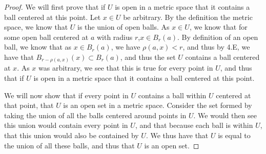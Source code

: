 \begin{proof}
  We will first prove that if $U$ is open in a metric space that it
  contains a ball centered at this point. Let $x \in U$ be arbitrary.
  By the definition the metric space, we know that $U$
  is the union of open balls. As $x \in U$, we know that for some open
  ball centered at $a$ with radius $r$,$x \in B_r(a)$. By definition
  of an open ball, we know that as $x \in B_r(a)$, we have
  $\rho(a,x)<r$, and thus by 4.E, we have that
  $B_{r-\rho(a,x)}(x)\subset B_r(a)$, and thus  the set $U$ contains a
  ball centered at $x$. As $x$ was arbitrary, we see that this is true
  for every point in $U$, and thus that if $U$ is open in a metric space that it
  contains a ball centered at this point.

  We will now show that if every point in $U$ contains a ball within $U$ centered
  at that point, that $U$ is an open set in a metric space. Consider
  the set formed by taking the union of all the balls centered around
  points in $U$. We would then see this union would contain every
  point in $U$, and that because each ball is within $U$, that this
  union would also be contained by $U$. We thus have that $U$ is equal
  to the union of all these balls, and thus that $U$ is an open set.
\end{proof}
